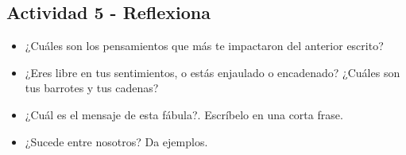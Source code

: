 \documentclass[10pt,twoside]{article}
\begin{document}
\subsection*{Actividad 5 - Reflexiona}
\begin{itemize}
  \item ¿Cuáles son los pensamientos que más te impactaron del anterior escrito?
  \item ¿Eres libre en tus sentimientos, o estás enjaulado o encadenado? ¿Cuáles son tus barrotes y tus cadenas?
  \item ¿Cuál es el mensaje de esta fábula?. Escríbelo en una corta frase.
  \item ¿Sucede entre nosotros? Da ejemplos.
\end{itemize}
\end{document}

